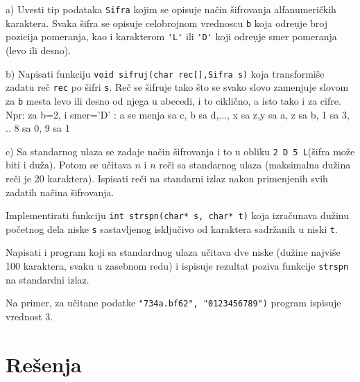 \begin{Exercise}[label=p2.3_] 
\begin{description}
 \item {a)} Uvesti tip podataka \verb|Sifra| kojim se opisuje na\v cin
   \v sifrovanja alfanumeri\v ckih karaktera.  Svaka \v sifra se
   opisuje celobrojnom vrednoscu \verb|b| koja odre\d uje broj
   pozicija pomeranja, kao i karakterom \verb|'L'| ili \verb|'D'| koji
   odre\d uje smer pomeranja (levo ili desno).
  \item{b)} Napisati funkciju \verb|void sifruj(char rec[],Sifra s)|
    koja transformi\v se zadatu re\v c \verb|rec| po \v sifri
    \verb|s|. Re\v c se \v sifruje tako \v sto se svako slovo
    zamenjuje slovom za \verb|b| mesta levo ili desno od njega u
    abecedi, i to cikli\v cno, a isto tako i za cifre.\\ Npr: za b=2,
    i smer='D' : a se menja sa c, b sa d,..., x sa z,y sa a, z sa b, 1
    sa 3, .. 8 sa 0, 9 sa 1
 \item{c)} Sa standarnog ulaza se zadaje na\v cin \v sifrovanja i to u
   obliku \verb|2 D 5 L|(\v sifra mo\v ze biti i du\v za). Potom se
   u\v citava $n$ i $n$ re\v ci sa standarnog ulaza (maksimalna du\v
   zina re\v ci je 20 karaktera).  Ispisati re\v ci na standarni izlaz
   nakon primenjenih svih zadatih na\v cina \v sifrovanja.
\end{description}
\end{Exercise}
\begin{Answer}[ref=p2.3_]
\end{Answer}


\begin{Exercise}[label=p2.3_] 
Implementirati funkciju \verb|int strspn(char* s, char* t)|
koja izra\v cunava du\v zinu po\v cetnog dela niske \verb|s| sastavljenog
isklju\v civo od karaktera sadr\v zanih u niski \verb|t|.

Napisati i program koji sa standardnog ulaza u\v citava dve niske (du\v zine
najvi\v se 100 karaktera, svaku u zasebnom redu) i ispisuje rezultat poziva
funkcije \verb|strspn| na standardni izlaz.

Na primer, za u\v{c}itane podatke \verb|"734a.bf62", "0123456789")| program
ispisuje vrednost 3.
\end{Exercise}
\begin{Answer}[ref=p2.3_]
\end{Answer}

\ifresenja
\section{Rešenja}
\shipoutAnswer
\fi
